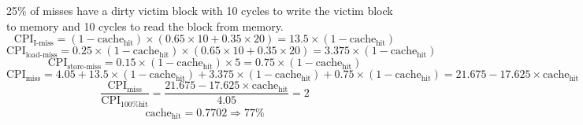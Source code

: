 \documentclass[10pt,letterpaper]{article}
\begin{document}
\begin{enumerate}[label=\textbf{Problem \arabic*.}]
\begin{enumerate}[label=\Alph*)]
	25\% of misses have a dirty victim block with 10 cycles to write the victim block to memory and 10 cycles to read the block from memory.
	\[\text{CPI}_{\text{I-miss}}=(1-\text{cache}_{\text{hit}})\times(0.65 \times 10 + 0.35 \times 20) = 13.5\times(1-\text{cache}_{\text{hit}})\]
	\[\text{CPI}_{\text{load-miss}}=0.25\times(1-\text{cache}_{\text{hit}})\times(0.65 \times 10 + 0.35 \times 20) = 3.375\times(1-\text{cache}_{\text{hit}})\]
	\[\text{CPI}_{\text{store-miss}}=0.15\times(1-\text{cache}_{\text{hit}})\times5=0.75\times(1-\text{cache}_{\text{hit}})\]
	\[\text{CPI}_{\text{miss}}=4.05 + 13.5\times(1-\text{cache}_{\text{hit}}) + 3.375\times(1-\text{cache}_{\text{hit}}) + 0.75\times(1-\text{cache}_{\text{hit}})=21.675-17.625\times\text{cache}_{\text{hit}}\]
	\[\frac{\text{CPI}_{\text{miss}}}{\text{CPI}_{\text{100\% hit}}}=\frac{21.675-17.625\times\text{cache}_{\text{hit}}}{4.05}=2\]
	\[\text{cache}_{\text{hit}}=0.7702\Rightarrow\boxed{77\%}\]
	\end{enumerate}
\end{enumerate}
\end{document}
